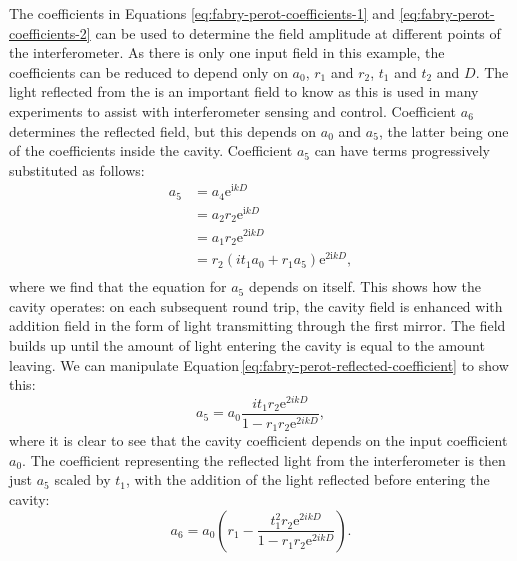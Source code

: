 The coefficients in Equations \ref{eq:fabry-perot-coefficients-1} and \ref{eq:fabry-perot-coefficients-2} can be used to determine the field amplitude at different points of the interferometer. As there is only one input field in this example, the coefficients can be reduced to depend only on $a_0$, $r_1$ and $r_2$, $t_1$ and $t_2$ and $D$. The light reflected from the \FP{} is an important field to know as this is used in many experiments to assist with interferometer sensing and control. Coefficient $a_6$ determines the reflected field, but this depends on $a_0$ and $a_5$, the latter being one of the coefficients inside the cavity. Coefficient $a_5$ can have terms progressively substituted as follows:
\begin{equation}
  \label{eq:fabry-perot-reflected-coefficient}
  \begin{split}
    a_5 &= a_4 \text{e}^{\text{i} kD} \\
        &= a_2 r_2 \text{e}^{\text{i} kD} \\
        &= a_1 r_2 \text{e}^{\text{2i} kD} \\
        &= r_2 \left( it_1 a_0 + r_1 a_5 \right) \text{e}^{\text{2i} kD}, \\
  \end{split}
\end{equation}
where we find that the equation for $a_5$ depends on itself. This shows how the cavity operates: on each subsequent round trip, the cavity field is enhanced with addition field in the form of light transmitting through the first mirror. The field builds up until the amount of light entering the cavity is equal to the amount leaving. We can manipulate Equation\,\ref{eq:fabry-perot-reflected-coefficient} to show this:
\begin{equation}
  a_5 = a_0 \frac{it_1 r_2 \text{e}^{2ikD}}{1 - r_1 r_2 \text{e}^{2ikD}},
\end{equation}
where it is clear to see that the cavity coefficient depends on the input coefficient $a_0$. The coefficient representing the reflected light from the interferometer is then just $a_5$ scaled by $t_1$, with the addition of the light reflected before entering the cavity:
\begin{equation}
  a_6 = a_0 \left( r_1 - \frac{t_1^2 r_2 \text{e}^{2ikD}}{1 - r_1 r_2 \text{e}^{2ikD}} \right).
\end{equation}

